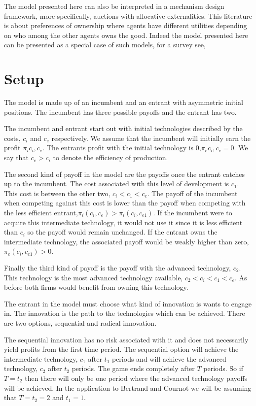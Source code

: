 \documentclass[11pt]{article}
\begin{document}
The model presented here can also be interpreted in a mechanism design framework, more specifically, auctions with allocative externalities. This literature is about preferences of ownership where agents have different utilities depending on who among the other agents owns the good. Indeed the model presented here can be presented as a special case of such models, for a survey see, \cite{Jehiel2005}


\section*{Setup}

The model is made up of an incumbent and an entrant with asymmetric initial positions. The incumbent has three possible payoffs and the entrant has two. 

The incumbent and entrant start out with initial technologies described by the costs, $c_i$ and $c_e$ respectively. We assume that the incumbent will initially earn the profit $\pi_i{c_i,c_e}$. The entrants profit with the initial technology is 0,$\pi_e{c_i,c_e}=0$. We say that $c_e>c_i$ to denote the efficiency of production. 

The second kind of payoff in the model are the payoffs once the entrant catches up to the incumbent. The cost associated with this level of development is $c_{1}$. This cost is between the other two, $c_i<c_{1}<c_e$. The payoff of the incumbent when competing against this cost is lower than the payoff when competing with the less efficient entrant,$ \pi_i( c_i,c_{e}) > \pi_i( c_i, c_{e1} )$. If the incumbent were to acquire this intermediate technology, it would not use it since it is less efficient than $c_i$ so the payoff would remain unchanged. If the entrant owns the intermediate technology, the associated payoff would be weakly higher than zero, $\pi_e(c_i,c_{e1})>0$.

Finally the third kind of payoff is the payoff with the advanced technology, $c_2$. This technology is the most advanced technology available, $c_2<c_i<c_1<c_e$. As before both firms would benefit from owning this technology. 

The entrant in the model must choose what kind of innovation is wants to engage in. The innovation is the path to the technologies which can be achieved. There are two options, sequential and radical innovation. 

The sequential innovation has no risk associated with it and does not necessarily yield profits from the first time period.  The sequential option will achieve the intermediate technology, $c_1$ after $t_1$ periods and will achieve the advanced technology, $c_2$ after $t_2$ periods. The game ends completely after $T$ periods. So if $T=t_2$ then there will only be one period where the advanced technology payoffs will be achieved. In the application to Bertrand and Cournot we will be assuming that $T=t_2=2$ and $t_1=1$. 
\end{document}
